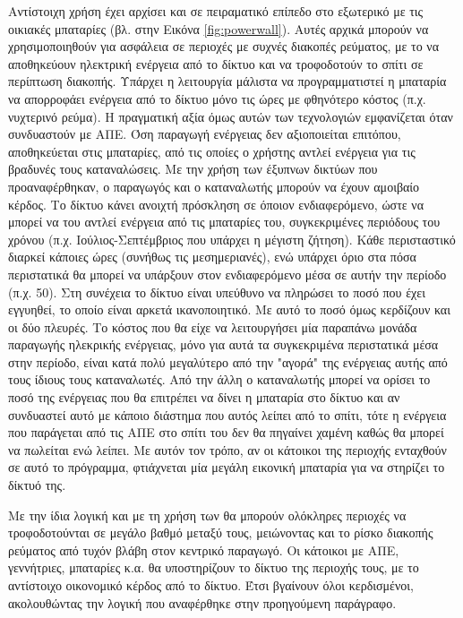 \documentclass[12pt]{report}
\begin{document}
Αντίστοιχη χρήση έχει αρχίσει και σε πειραματικό επίπεδο στο εξωτερικό με τις οικιακές μπαταρίες (βλ. {} στην Εικόνα \ref{fig:powerwall}). 
Αυτές αρχικά μπορούν να χρησιμοποιηθούν για ασφάλεια σε περιοχές με συχνές διακοπές ρεύματος, με το να αποθηκεύουν
ηλεκτρική ενέργεια από το δίκτυο και να τροφοδοτούν το σπίτι σε περίπτωση διακοπής. Υπάρχει η λειτουργία μάλιστα να προγραμματιστεί η μπαταρία να απορροφάει ενέργεια από το δίκτυο μόνο τις ώρες με φθηνότερο κόστος (π.χ. νυχτερινό
ρεύμα). Η πραγματική αξία όμως αυτών των τεχνολογιών εμφανίζεται όταν συνδυαστούν με ΑΠΕ. Όση παραγωγή ενέργειας δεν αξιοποιείται επιτόπου, αποθηκεύεται στις μπαταρίες, από τις οποίες ο χρήστης αντλεί ενέργεια για τις βραδυνές
τους καταναλώσεις. Με την χρήση των έξυπνων δικτύων που προαναφέρθηκαν, ο παραγωγός και ο καταναλωτής μπορούν να έχουν αμοιβαίο κέρδος.
Το δίκτυο κάνει ανοιχτή πρόσκληση σε όποιον ενδιαφερόμενο, ώστε να μπορεί να του αντλεί ενέργεια από τις μπαταρίες του, συγκεκριμένες περιόδους του χρόνου (π.χ. Ιούλιος-Σεπτέμβριος που υπάρχει η μέγιστη ζήτηση). Κάθε περισταστικό
διαρκεί κάποιες ώρες (συνήθως τις μεσημεριανές), ενώ υπάρχει όριο στα πόσα περιστατικά θα μπορεί να υπάρξουν στον ενδιαφερόμενο μέσα σε αυτήν την περίοδο (π.χ. 50). Στη συνέχεια το δίκτυο είναι υπεύθυνο να πληρώσει το ποσό 
που έχει εγγυηθεί, το οποίο είναι αρκετά ικανοποιητικό. Με αυτό το ποσό όμως κερδίζουν και οι δύο πλευρές. Το κόστος που θα είχε να λειτουργήσει μία παραπάνω μονάδα παραγωγής ηλεκρικής ενέργειας, 
μόνο για αυτά τα συγκεκριμένα περιστατικά μέσα στην περίοδο, είναι κατά πολύ μεγαλύτερο από την "αγορά" της ενέργειας αυτής από τους ίδιους τους καταναλωτές. Από την άλλη ο καταναλωτής μπορεί να ορίσει το ποσό της ενέργειας
που θα επιτρέπει να δίνει η μπαταρία στο δίκτυο και αν συνδυαστεί αυτό με κάποιο διάστημα που αυτός λείπει από το σπίτι, τότε η ενέργεια που παράγεται από τις ΑΠΕ στο σπίτι του δεν θα πηγαίνει χαμένη καθώς
θα μπορεί να πωλείται ενώ λείπει. Με αυτόν τον τρόπο, αν οι κάτοικοι της περιοχής ενταχθούν σε αυτό το πρόγραμμα, φτιάχνεται μία μεγάλη εικονική μπαταρία για να στηρίζει το δίκτυό της.

Με την ίδια λογική και με τη χρήση των {} θα μπορούν ολόκληρες περιοχές να τροφοδοτούνται σε μεγάλο βαθμό μεταξύ τους, μειώνοντας και το ρίσκο διακοπής ρεύματος από τυχόν βλάβη στον κεντρικό παραγωγό. 
Οι κάτοικοι με ΑΠΕ, γεννήτριες, μπαταρίες κ.α. θα υποστηρίζουν το δίκτυο της περιοχής τους, με το αντίστοιχο οικονομικό κέρδος από το δίκτυο. Έτσι βγαίνουν όλοι κερδισμένοι, ακολουθώντας την λογική που αναφέρθηκε
στην προηγούμενη παράγραφο.
\end{document}
